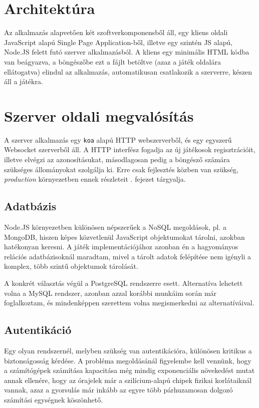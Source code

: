 \section{Architektúra}

Az alkalmazás alapvetően két szoftverkomponensből áll, egy kliens oldali
JavaScript alapú Single Page Application-ből, illetve egy szintén JS alapú,
Node.JS felett futó szerver alkalmazásból.  A kliens egy minimális HTML kódba
van beágyazva, a böngészőbe ezt a fájlt betöltve (azaz a játék oldalára
ellátogatva) elindul az alkalmazás, automatikusan csatlakozik a szerverre,
készen áll a játékra.

\section{Szerver oldali megvalósítás}

A szerver alkalmazás egy \texttt{koa} alapú  HTTP webszerverből, és egy egyszerű
Websocket szerverből áll. A HTTP interfész fogadja az új játékosok
regisztrációit, illetve elvégzi az azonosításukat, másodlagosan pedig a böngésző
számára szükséges állományokat szolgálja ki. Erre csak fejlesztés közben van
szükség, \emph{production} környezetben ennek részleteit .
fejezet tárgyalja.

\subsection{Adatbázis}

Node.JS környezetben különösen népszerűek a NoSQL megoldások, pl. a
MongoDB\cite{mongo}, hiszen képes közvetlenül JavaScript objektumokat tárolni,
azokban hatékonyan keresni. A játék implementációjához azonban én a hagyományos
relációs adatbázisoknál maradtam, mivel a tárolt adatok felépítése nem igényli a
komplex, több szintű objektumok tárolását.

A konkrét választás végül a PostgreSQL\cite{postgres} rendszerre esett.
Alternatíva lehetett volna a MySQL rendszer, azonban azzal korábbi munkáim során
már foglalkoztam, és mindenképpen szerettem volna megismerkedni az
alternatíváival.

\subsection{Autentikáció}

Egy olyan rendszernél, melyben szükség van autentikációra, különösen kritikus a
biztonságosság kérdése. A probléma megoldásánál figyelembe kell vennünk, hogy a
számítógépek számítása kapacitása még mindig exponenciális növekedést mutat
annak ellenére, hogy az órajelek már a szilícium-alapú chipek fizikai
korlátaiknál vannak\cite{moore}, azaz a gyorsulás már inkább az egyre több
párhuzamosan dolgozó számítási egységnek köszönhető.

